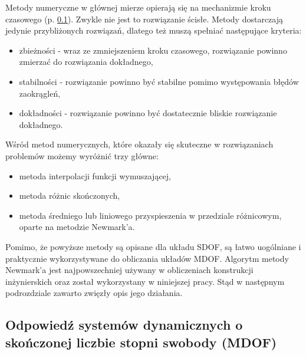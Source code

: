 Metody numeryczne w głównej mierze opierają się na mechanizmie kroku czasowego  (p. \ref{section: mdof_response}). Zwykle nie jest to rozwiązanie ścisłe. Metody dostarczają jedynie przybliżonych rozwiązań, dlatego też muszą spełniać następujące kryteria:
\begin{itemize}
	\item zbieżności  - wraz ze zmniejszeniem kroku czasowego, rozwiązanie powinno zmierzać do rozwiązania dokładnego,
	\item stabilności  - rozwiązanie powinno być stabilne pomimo występowania błędów zaokrągleń,
	\item dokładności  - rozwiązanie powinno być dostatecznie bliskie rozwiązanie dokładnego.
\end{itemize}
Wśród metod numerycznych, które okazały się skuteczne w rozwiązaniach problemów możemy wyróżnić trzy główne:
\begin{itemize}
\item metoda interpolacji funkcji wymuszającej,
\item metoda różnic skończonych,
\item metoda średniego lub liniowego przyspieszenia w przedziale różnicowym, oparte na metodzie Newmark'a.
\end{itemize}
Pomimo, że powyższe metody są opisane dla układu SDOF, są łatwo uogólniane i praktycznie wykorzystywane do obliczania układów MDOF. Algorytm metody Newmark'a jest najpowszechniej używany w obliczeniach konstrukcji inżynierskich oraz został wykorzystany w niniejszej pracy. Stąd w następnym podrozdziale zawarto zwięzły opis jego działania.


\subsection{Odpowiedź systemów dynamicznych o skończonej liczbie stopni swobody (MDOF)} \label{section: mdof_response}

